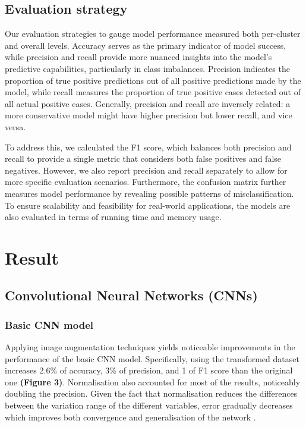 \documentclass[letterpaper,9pt,twocolumn,twoside,]{pinp}
\begin{document}
\hypertarget{evaluation-strategy}{%
\subsection{Evaluation strategy}\label{evaluation-strategy}}

Our evaluation strategies to gauge model performance measured both
per-cluster and overall levels. Accuracy serves as the primary indicator
of model success, while precision and recall provide more nuanced
insights into the model's predictive capabilities, particularly in class
imbalances. Precision indicates the proportion of true positive
predictions out of all positive predictions made by the model, while
recall measures the proportion of true positive cases detected out of
all actual positive cases. Generally, precision and recall are inversely
related: a more conservative model might have higher precision but lower
recall, and vice versa.

To address this, we calculated the F1 score, which balances both
precision and recall to provide a single metric that considers both
false positives and false negatives. However, we also report precision
and recall separately to allow for more specific evaluation scenarios.
Furthermore, the confusion matrix further measures model performance by
revealing possible patterns of misclassification. To ensure scalability
and feasibility for real-world applications, the models are also
evaluated in terms of running time and memory usage.

\hypertarget{result}{%
\section{Result}\label{result}}

\hypertarget{convolutional-neural-networks-cnns}{%
\subsection{Convolutional Neural Networks
(CNNs)}\label{convolutional-neural-networks-cnns}}

\hypertarget{basic-cnn-model}{%
\subsubsection{Basic CNN model}\label{basic-cnn-model}}

Applying image augmentation techniques yields noticeable improvements in
the performance of the basic CNN model. Specifically, using the
transformed dataset increases 2.6\% of accuracy, 3\% of precision, and 1
of F1 score than the original one \textbf{(Figure 3)}. Normalisation
also accounted for most of the results, noticeably doubling the
precision. Given the fact that normalisation reduces the differences
between the variation range of the different variables, error gradually
decreases \citep{sola1997importance} which improves both convergence and
generalisation of the network \citep{shao2020normalization}.
\end{document}
